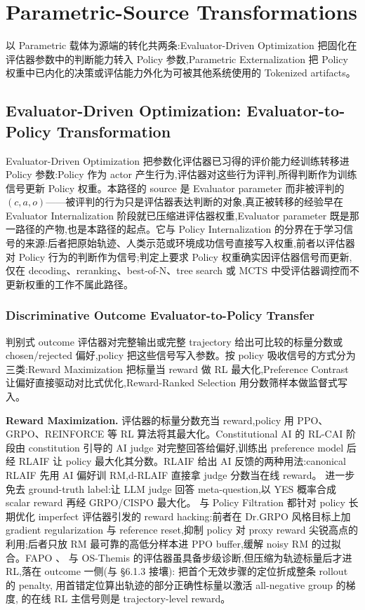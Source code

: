 \section{Parametric-Source Transformations}

以 Parametric 载体为源端的转化共两条:Evaluator-Driven Optimization 把固化在评估器参数中的判断能力转入 Policy 参数,Parametric Externalization 把 Policy 权重中已内化的决策或评估能力外化为可被其他系统使用的 Tokenized artifacts。

\subsection{Evaluator-Driven Optimization: Evaluator-to-Policy Transformation}

Evaluator-Driven Optimization 把参数化评估器已习得的评价能力经训练转移进 Policy 参数:Policy 作为 actor 产生行为,评估器对这些行为评判,所得判断作为训练信号更新 Policy 权重。本路径的 source 是 Evaluator parameter 而非被评判的 $(c,a,o)$——被评判的行为只是评估器表达判断的对象,真正被转移的经验早在 Evaluator Internalization 阶段就已压缩进评估器权重,Evaluator parameter 既是那一路径的产物,也是本路径的起点。它与 Policy Internalization 的分界在于学习信号的来源:后者把原始轨迹、人类示范或环境成功信号直接写入权重,前者以评估器对 Policy 行为的判断作为信号;判定上要求 Policy 权重确实因评估器信号而更新,仅在 decoding、reranking、best-of-N、tree search 或 MCTS 中受评估器调控而不更新权重的工作不属此路径。

\subsubsection{Discriminative Outcome Evaluator-to-Policy Transfer}

判别式 outcome 评估器对完整输出或完整 trajectory 给出可比较的标量分数或 chosen/rejected 偏好,policy 把这些信号写入参数。按 policy 吸收信号的方式分为三类:Reward Maximization 把标量当 reward 做 RL 最大化,Preference Contrast 让偏好直接驱动对比式优化,Reward-Ranked Selection 用分数筛样本做监督式写入。

\textbf{Reward Maximization.} 评估器的标量分数充当 reward,policy 用 PPO、GRPO、REINFORCE 等 RL 算法将其最大化。Constitutional AI \cite{Bai22b} 的 RL-CAI 阶段由 constitution 引导的 AI judge 对完整回答给偏好,训练出 preference model 后经 RLAIF 让 policy 最大化其分数。RLAIF \cite{Lee23b} 给出 AI 反馈的两种用法:canonical RLAIF 先用 AI 偏好训 RM,d-RLAIF 直接拿 judge 分数当在线 reward。\cite{Ren26b} 进一步免去 ground-truth label:让 LLM judge 回答 meta-question,以 YES 概率合成 scalar reward 再经 GRPO/CISPO 最大化。\cite{Ack26} 与 Policy Filtration \cite{She24c} 都针对 policy 长期优化 imperfect 评估器引发的 reward hacking:前者在 Dr.GRPO 风格目标上加 gradient regularization 与 reference reset,抑制 policy 对 proxy reward 尖锐高点的利用;后者只放 RM 最可靠的高低分样本进 PPO buffer,缓解 noisy RM 的过拟合。FAPO \cite{Din25b}、\cite{Che25v} 与 OS-Themis \cite{Li26p} 的评估器虽具备步级诊断,但压缩为轨迹标量后才进 RL,落在 outcome 一侧(与 §6.1.3 接壤):\cite{Din25b} 把首个无效步骤的定位折成整条 rollout 的 penalty,\cite{Che25v} 用首错定位算出轨迹的部分正确性标量以激活 all-negative group 的梯度,\cite{Li26p} 的在线 RL 主信号则是 trajectory-level reward。

